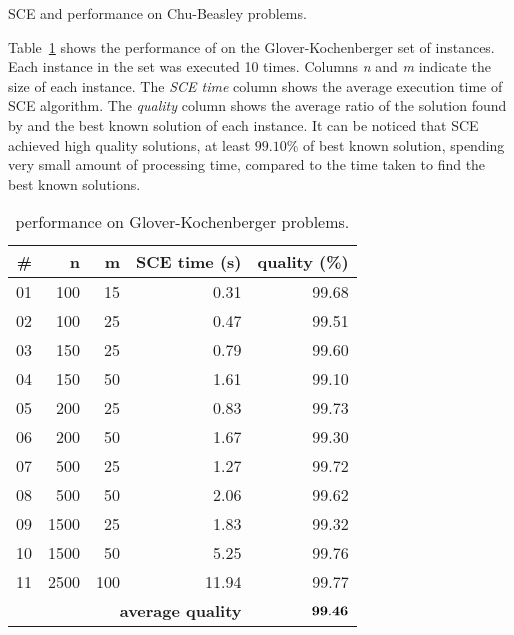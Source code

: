 \begin{table}
{
\renewcommand{\arraystretch}{1.3}%
\fontsize{8.5pt}{1em}\selectfont 
\begin{center}
  
\end{center}
}
 \caption{SCE and \scecore  performance on Chu-Beasley problems.}
 \label{tab:chu}
\end{table}

Table~\ref{tab:gk} shows the performance of \scecore on the Glover-Kochenberger set of instances.
Each instance in the set was executed 10 times.
Columns \textit{n} and \textit{m} indicate the size of each instance.
The \textit{SCE time} column shows the average execution time of SCE algorithm.
The \textit{quality} column shows the average ratio of the solution found by \scecore and
the best known solution of each instance.
It can be noticed that SCE achieved high quality solutions, at least $99.10\%$
of best known solution, spending very small amount of processing time, compared
to the time taken to find the best known solutions.

\begin{table}
{
\renewcommand{\arraystretch}{1.7}%
\fontsize{8.5pt}{1em}\selectfont 
\begin{center}
\begin{tabular}{|r|r|r|r|r|} \hline
		\textbf{\#} & \textbf{n}   & \textbf{m}  & \textbf{SCE time (s)} & \textbf{quality (\%)} \\ \hline
01 & 100 & 15 & 0.31 & 99.68 \\ \hline
02 & 100 & 25 & 0.47 & 99.51 \\ \hline
03 & 150 & 25 & 0.79 & 99.60 \\ \hline
04 & 150 & 50 & 1.61 & 99.10 \\ \hline
05 & 200 & 25 & 0.83 & 99.73 \\ \hline
06 & 200 & 50 & 1.67 & 99.30 \\ \hline
07 & 500 & 25 & 1.27 & 99.72 \\ \hline
08 & 500 & 50 & 2.06 & 99.62 \\ \hline
09 &1500 & 25 & 1.83 & 99.32 \\ \hline
10 &1500 & 50 & 5.25 & 99.76 \\ \hline
11 &2500 &100 &11.94 & 99.77 \\ \cline{1-5}
    \multicolumn{4}{|r|}{\textbf{average quality}}  & $\bf 99.46$  \\ \hline
\end{tabular}
\end{center}
}
 \caption{\scecore performance on Glover-Kochenberger problems.}
 \label{tab:gk}
\end{table}


